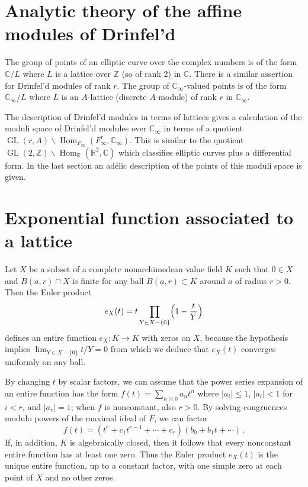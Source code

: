 \documentclass[12pt,a4paper]{article}
\theoremstyle{plain}
\theoremstyle{definition}
\theoremstyle{remark}
\DeclareMathOperator{\Hom}{Hom}
\DeclareMathOperator{\GL}{GL}
\begin{document}
\section*{Analytic theory of the affine modules of Drinfel'd}

The group of points of an elliptic curve over the complex numbers is of the 
form $\mathbb{C}/L$ where $L$ is a lattice over $\mathbb{Z}$ (so of rank 2) in 
$\mathbb{C}$. There is a similar assertion for Drinfel'd modules of rank $r$. 
The group of $\mathbb{C}_\infty$-valued points is of the form 
$\mathbb{C}_\infty/L$ where $L$ is an $A$-lattice (discrete $A$-module) of 
rank $r$ in $\mathbb{C}_\infty$.

The description of Drinfel'd modules in terms of lattices gives a calculation 
of the moduli space of Drinfel'd modules over $\mathbb{C}_\infty$ in terms of a 
quotient $\GL(r,A) \backslash \Hom_{F_\infty}(F_\infty^r, \mathbb{C}_\infty)$. This 
is similar to the quotient $\GL(2,\mathbb{Z}) \backslash \Hom_\mathbb{R}(\mathbb{R}^2, \mathbb{C})$ 
which classifies elliptic curves plus a differential form. In the last section 
an ad\'elic description of the points of this moduli space is given.


\section{Exponential function associated to a lattice}

Let $X$ be a subset of a complete nonarchimedean value field $K$ such that 
$0 \in X$ and $B(a,r) \cap X$ is finite for any ball $B(a,r) \subset K$ around 
$a$ of radius $r > 0$. Then the Euler product
\[
e_X(t) = t \prod_{Y \in X - \{0\}} \Bigl(1 - \frac{t}{Y}\Bigr)
\]
defines an entire function $e_X\colon K \to K$ with zeros on $X$, because the 
hypothesis implies $\lim_{Y \in X - \{0\}} t/Y = 0$ from which we deduce that 
$e_X(t)$ converges uniformly on any ball.

By changing $t$ by scalar factors, we can assume that the power series 
expansion of an entire function has the form $f(t) = \sum_{n \geqslant 0} a_n t^n$ 
where $|a_i| \leqslant 1$, $|a_i| < 1$ for $i < r$, and $|a_r| = 1$; when $f$ 
is nonconstant, also $r > 0$. By solving congruences modulo powers of the 
maximal ideal of $F$, we can factor
\[
f(t) = (t^r + c_1 t^{r-1} + \cdots + c_r)(b_0 + b_1 t + \cdots) \,.
\]
If, in addition, $K$ is algebraically closed, then it follows that every 
nonconstant entire function has at least one zero. Thus the Euler product 
$e_X(t)$ is the unique entire function, up to a constant factor, with one 
simple zero at each point of $X$ and no other zeros.
\end{document}

